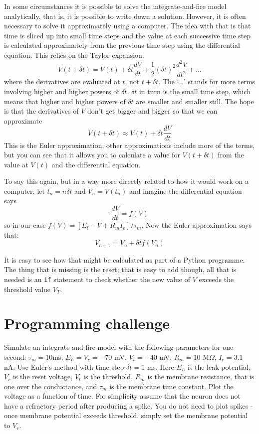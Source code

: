 \documentclass[12pt]{article}
\begin{document}
In some circumstances it is possible to solve the integrate-and-fire
model analytically, that is, it is possible to write down a
solution. However, it is often necessary to solve it approximately
using a computer. The idea with that is that time is sliced up into
small time steps and the value at each successive time step is
calculated approximately from the previous time step using the
differential equation. This relies on the Taylor expansion:
\begin{equation}
V(t+\delta t)=V(t)+\delta t \frac{dV}{dt}+\frac{1}{2}(\delta t)^2\frac{d^2V}{dt^2}+\ldots
\end{equation}
where the derivatives are evaluated at $t$, not $t+\delta t$. The
\lq{}\ldots\rq{} stands for more terms involving higher and higher
powers of $\delta t$. $\delta t$ in turn is the small time step, which
means that higher and higher powers of $\delta t$ are smaller and
smaller still. The hope is that the derivatives of $V$ don't get bigger and bigger so that we can approximate
\begin{equation}
V(t+\delta t)\approx V(t)+\delta t \frac{dV}{dt}
\end{equation}
This is the Euler approximation, other approximations include more of
the terms, but you can see that it allows you to calculate a value for
$V(t+\delta t)$ from the value at $V(t)$ and the differential equation.

To say this again, but in a way more directly related to how it would
work on a computer, let $t_n=n\delta t$ and $V_n=V(t_n)$ and imagine the differential equation says
\begin{equation}
\frac{dV}{dt}=f(V)
\end{equation}
so in our case $f(V)=[E_l-V+R_mI_e]/\tau_m$. Now the
Euler approximation says that:
\begin{equation}
V_{n+1}=V_n+\delta t f(V_n)
\end{equation}

It is easy to see how that might be calculated as part of a Python
programme. The thing that is missing is the reset; that is easy to add
though, all that is needed is an \texttt{if} statement to check
whether the new value of $V$ exceeds the threshold value $V_T$.

\section*{Programming challenge}

Simulate an integrate and fire model with the following parameters for
one second: $\tau_m = 10 $ms, $E_L = V_r = -70$ mV, $V_t = -40$ mV,
$R_m= 10$ M$\Omega$, $I_e = 3.1 $ nA. Use Euler's method with time-step
$\delta t = 1$ ms. Here $E_L$ is the leak potential, $V_r$ is the
reset voltage, $V_t$ is the threshold, $R_m$ is the membrane
resistance, that is one over the conductance, and $\tau_m$ is the
membrane time constant. Plot the voltage as a function of time. For
simplicity assume that the neuron does not have a refractory period
after producing a spike. You do not need to plot spikes - once
membrane potential exceeds threshold, simply set the membrane
potential to $V_r$.
\end{document}
